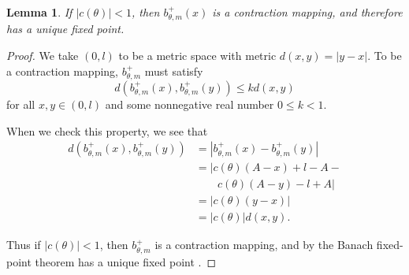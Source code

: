 \documentclass[letterpaper, 10 pt, conference]{ieeeconf}  %
\newtheorem{lemma}{\bf Lemma}
\begin{document}
\begin{lemma} \label{Lemma:4}
If $|c(\theta)| < 1$, then $b^+_{\theta,m}(x)$ is a contraction
mapping, and therefore has a unique fixed point.
\end{lemma}
\begin{proof}
We take $(0,l)$ to be a metric space with metric $d(x,y) =
|y-x|$. To be a contraction mapping, $b^+_{\theta,m}$ must satisfy
\begin{equation*}
d(b^+_{\theta,m}(x), b^+_{\theta,m}(y)) \leq k d(x,y) 
\end{equation*}
\noindent for all $x, y \in (0,l)$ and some nonnegative real number $0 \leq k < 1$.

When we check this property, we see that
\begin{align*}
d(b^+_{\theta,m}(x), b^+_{\theta,m}(y)) & = | b^+_{\theta,m}(x) - b^+_{\theta,m}(y)|\\
								 & = | c(\theta)(A-x)+l-A - \\
								 & \qquad c(\theta)(A-y)-l+A| \\
                               & = | c(\theta) (y-x) | \\
                               & = | c(\theta) | d(x,y).
\end{align*}

Thus if $|c(\theta)| <1$, then $b^+_{\theta,m}$ is a contraction mapping, and by the Banach fixed-point
theorem has a unique fixed point \cite{Granas2003}.
\end{proof}
\end{document}
